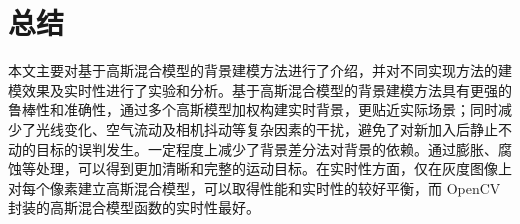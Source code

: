 \section{总结}
本文主要对基于高斯混合模型的背景建模方法进行了介绍，并对不同实现方法的建模效果及实时性进行了实验和分析。基于高斯混合模型的背景建模方法具有更强的鲁棒性和准确性，通过多个高斯模型加权构建实时背景，更贴近实际场景；同时减少了光线变化、空气流动及相机抖动等复杂因素的干扰，避免了对新加入后静止不动的目标的误判发生。一定程度上减少了背景差分法对背景的依赖。通过膨胀、腐蚀等处理，可以得到更加清晰和完整的运动目标。在实时性方面，仅在灰度图像上对每个像素建立高斯混合模型，可以取得性能和实时性的较好平衡，而 OpenCV 封装的高斯混合模型函数的实时性最好。